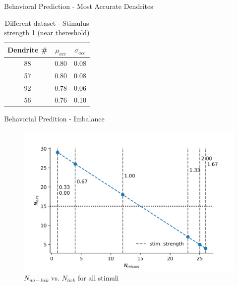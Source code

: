 \documentclass[10pt]{beamer}
\begin{document}
\begin{frame}[fragile]{Behavioral Prediction - Most Accurate Dendrites}
\begin{table}
    \caption*{Different dataset - Stimulus strength 1 (near thereshold)}
    \begin{tabular}{c|c|c}
      \toprule
      Dendrite \# & $\mu_{acc}$ & $\sigma_{acc}$\\
      \midrule
      88 & 0.80 & 0.08\\
      57 & 0.80 & 0.08\\
      92 & 0.78 & 0.06\\
      56 & 0.76 & 0.10\\
      \bottomrule
    \end{tabular}
  \end{table}
\end{frame}

\begin{frame}[fragile]{Behavorial Predition - Imbalance}
\begin{center}
	\begin{figure}
	  \caption*{$N_{no-lick}$ vs. $N_{lick}$ for all stimuli}
      \includegraphics[width=1.0\textwidth]{fraction.png}
	\end{figure}
	\end{center}
\end{frame}

\end{document}
